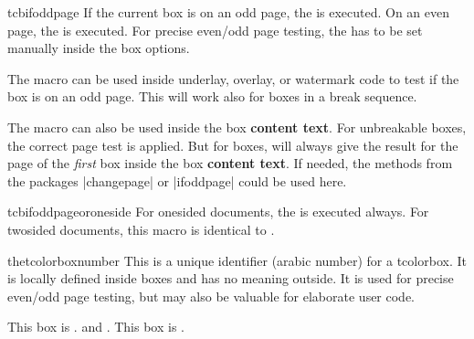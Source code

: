 \clearpage
\begin{docCommand}[doc new=2015-11-13]{tcbifoddpage}{}
If the current box is on an odd page, the  is executed.
On an even page, the  is executed.
For precise even/odd page testing, the  has to be
set manually inside the box options.

The macro  can be used inside underlay, overlay, or watermark code to
test if the box is on an odd page. This will work also for boxes in a break sequence.

The macro can also be used inside the box \textbf{content text}. For unbreakable boxes,
the correct page test is applied.
But for  boxes, 
will always give the result for the page of the \emph{first} box inside
the box \textbf{content text}. If needed, the methods from the packages
|changepage| or |ifoddpage| could be used here.

\begin{dispExample}

\begin{tcolorbox}[enhanced,check odd page,
  title={Example for a box on an \tcbifoddpage{odd}{even} page},
  watermark text={\tcbifoddpage{Odd}{Even} page!}]
\lipsum[1]
\end{tcolorbox}
\end{dispExample}
\end{docCommand}


\begin{docCommand}[doc new=2016-11-18]{tcbifoddpageoroneside}{}
  For onesided documents, the  is executed always.
  For twosided documents, this macro is identical to .
\end{docCommand}

\clearpage
\begin{docCommand}[doc new=2015-11-13]{thetcolorboxnumber}{}
This is a unique identifier (arabic number) for a tcolorbox. It is locally
defined inside boxes and has no meaning outside. It is used for
precise even/odd page testing, but may also be valuable for elaborate user
code.

\begin{dispExample}
\begin{tcolorbox}[colback=yellow!5,title=Box \thetcolorboxnumber]
  This box is \thetcolorboxnumber.
   and
  .
  This box is \thetcolorboxnumber.
\end{tcolorbox}
\end{dispExample}
\end{docCommand}


